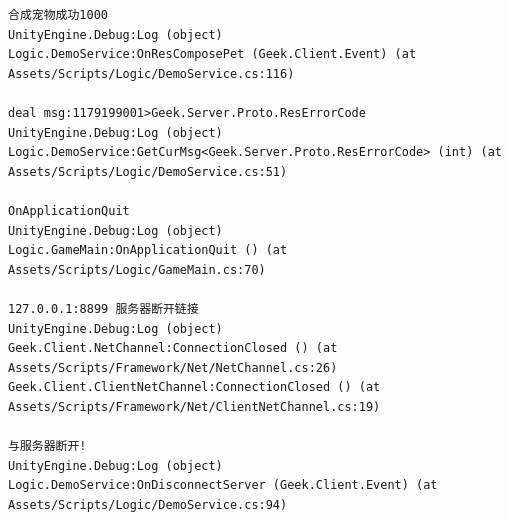 \documentclass[9pt, b5paper]{article}
\begin{document}
\begin{verbatim}
合成宠物成功1000
UnityEngine.Debug:Log (object)
Logic.DemoService:OnResComposePet (Geek.Client.Event) (at Assets/Scripts/Logic/DemoService.cs:116)

deal msg:1179199001>Geek.Server.Proto.ResErrorCode
UnityEngine.Debug:Log (object)
Logic.DemoService:GetCurMsg<Geek.Server.Proto.ResErrorCode> (int) (at Assets/Scripts/Logic/DemoService.cs:51)

OnApplicationQuit
UnityEngine.Debug:Log (object)
Logic.GameMain:OnApplicationQuit () (at Assets/Scripts/Logic/GameMain.cs:70)

127.0.0.1:8899 服务器断开链接
UnityEngine.Debug:Log (object)
Geek.Client.NetChannel:ConnectionClosed () (at Assets/Scripts/Framework/Net/NetChannel.cs:26)
Geek.Client.ClientNetChannel:ConnectionClosed () (at Assets/Scripts/Framework/Net/ClientNetChannel.cs:19)

与服务器断开!
UnityEngine.Debug:Log (object)
Logic.DemoService:OnDisconnectServer (Geek.Client.Event) (at Assets/Scripts/Logic/DemoService.cs:94)
\end{verbatim}
\end{document}
